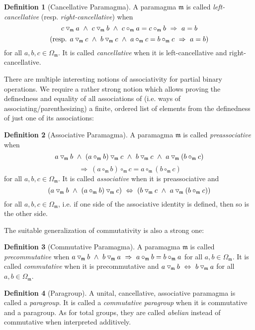 \documentclass{article}
\theoremstyle{definition}
\newtheorem{definition}{Definition}[section]
\newcommand{\impl}{~\Rightarrow~}
\newcommand{\eqv}{~\Leftrightarrow~}
\newcommand{\conj}{~\land~}
\newcommand{\tridown}{\mathbin{\hspace{.1em}\raisebox{.02em}{\rotatebox[origin=c]{90}{$\triangleleft$}}}}
\newcommand{\comp}{\tridown}
\begin{document}
\begin{definition}[Cancellative Paramagma]
A paramagma \(\mathfrak{m}\) is called \textit{left-cancellative} (resp. \textit{right-cancellative}) when \[c\comp_\mathfrak{m}a\conj c\comp_\mathfrak{m}b\conj c\circ_\mathfrak{m}a=c\circ_\mathfrak{m}b\impl a=b\]\[(\text{resp. }a\comp_\mathfrak{m}c\conj b\comp_\mathfrak{m}c\conj a\circ_\mathfrak{m}c=b\circ_\mathfrak{m}c\impl a=b)\] for all \(a,b,c\in\Omega_\mathfrak{m}\). It is called \textit{cancellative} when it is left-cancellative and right-cancellative.
\end{definition}

There are multiple interesting notions of associativity for partial binary operations. We require a rather strong notion which allows proving the definedness and equality of all associations of (i.e. ways of associating/parenthesizing) a finite, ordered list of elements from the definedness of just one of its associations:

\begin{definition}[Associative Paramagma]
A paramagma \(\mathfrak{m}\) is called \textit{preassociative} when \[a\comp_\mathfrak{m}b\conj(a\circ_\mathfrak{m}b)\comp_\mathfrak{m}c\conj b\comp_\mathfrak{m}c\conj a\comp_\mathfrak{m}(b\circ_\mathfrak{m}c)\]\[\impl(a\circ_\mathfrak{m}b)\circ_\mathfrak{m}c=a\circ_\mathfrak{m}(b\circ_\mathfrak{m}c)\] for all \(a,b,c\in\Omega_\mathfrak{m}\). It is called \textit{associative} when it is preassociative and \[(a\comp_\mathfrak{m}b\conj(a\circ_\mathfrak{m}b)\comp_\mathfrak{m}c)\eqv(b\comp_\mathfrak{m}c\conj a\comp_\mathfrak{m}(b\circ_\mathfrak{m}c))\] for all \(a,b,c\in\Omega_\mathfrak{m}\), i.e. if one side of the associative identity is defined, then so is the other side.
\end{definition}

The suitable generalization of commutativity is also a strong one:

\begin{definition}[Commutative Paramagma]
A paramagma \(\mathfrak{m}\) is called \textit{precommutative} when \(a\comp_\mathfrak{m}b\conj b\comp_\mathfrak{m}a\impl a\circ_\mathfrak{m}b=b\circ_\mathfrak{m}a\) for all \(a,b\in\Omega_\mathfrak{m}\). It is called \textit{commutative} when it is precommutative and \(a\comp_\mathfrak{m}b\eqv b\comp_\mathfrak{m}a\) for all \(a,b\in\Omega_\mathfrak{m}\).
\end{definition}

\begin{definition}[Paragroup]
A unital, cancellative, associative paramagma is called a \textit{paragroup}. It is called a \textit{commutative paragroup} when it is commutative and a paragroup. As for total groups, they are called \textit{abelian} instead of commutative when interpreted additively.
\end{definition}
\end{document}
